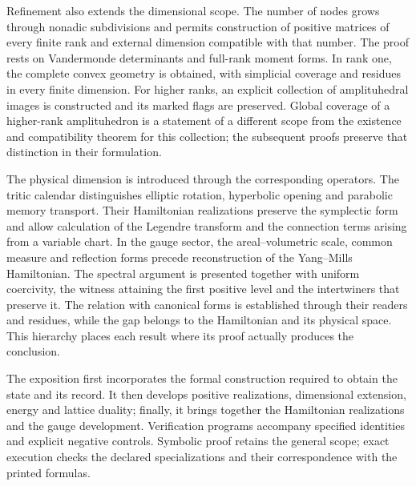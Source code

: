 Refinement also extends the dimensional scope. The number of nodes
grows through nonadic subdivisions and permits construction of positive
matrices of every finite rank and external dimension compatible with that
number. The proof rests on Vandermonde determinants and full-rank
moment forms. In rank one, the complete convex geometry is obtained,
with simplicial coverage and residues in every finite dimension.
For higher ranks, an explicit collection of amplituhedral images
is constructed and its marked flags are preserved. Global coverage
of a higher-rank amplituhedron is a statement of a different scope
from the existence and compatibility theorem for this collection; the
subsequent proofs preserve that distinction in their formulation.

The physical dimension is introduced through the corresponding operators.
The tritic calendar distinguishes elliptic rotation, hyperbolic opening and
parabolic memory transport. Their Hamiltonian realizations preserve
the symplectic form and allow calculation of the Legendre transform and
the connection terms arising from a variable chart. In the gauge
sector, the areal--volumetric scale, common measure and reflection
forms precede reconstruction of the Yang--Mills Hamiltonian.
The spectral argument is presented together with uniform coercivity, the
witness attaining the first positive level and the intertwiners that
preserve it. The relation with canonical forms is established through their
readers and residues, while the gap belongs to the Hamiltonian and
its physical space. This hierarchy places each result where
its proof actually produces the conclusion.

The exposition first incorporates the formal construction required to
obtain the state and its record. It then develops positive
realizations, dimensional extension, energy and lattice duality;
finally, it brings together the Hamiltonian realizations and the gauge development.
Verification programs accompany specified identities and
explicit negative controls. Symbolic proof retains the
general scope; exact execution checks the declared specializations
and their correspondence with the printed formulas.
